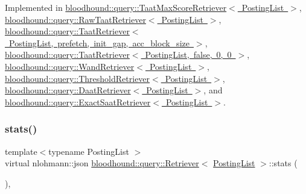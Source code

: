Implemented in \mbox{\hyperlink{classbloodhound_1_1query_1_1TaatMaxScoreRetriever_af4d96478395b58527969526c3068e7b9}{bloodhound\+::query\+::\+Taat\+Max\+Score\+Retriever$<$ Posting\+List $>$}}, \mbox{\hyperlink{classbloodhound_1_1query_1_1RawTaatRetriever_aafaaf842fdaef297a255e28766af2c0d}{bloodhound\+::query\+::\+Raw\+Taat\+Retriever$<$ Posting\+List $>$}}, \mbox{\hyperlink{classbloodhound_1_1query_1_1TaatRetriever_a58284f19458689021a083c07ea627485}{bloodhound\+::query\+::\+Taat\+Retriever$<$ Posting\+List, prefetch, init\+\_\+gap, acc\+\_\+block\+\_\+size $>$}}, \mbox{\hyperlink{classbloodhound_1_1query_1_1TaatRetriever_a58284f19458689021a083c07ea627485}{bloodhound\+::query\+::\+Taat\+Retriever$<$ Posting\+List, false, 0, 0 $>$}}, \mbox{\hyperlink{classbloodhound_1_1query_1_1WandRetriever_a5f3068bc363c16c5b7255a925ea5af8c}{bloodhound\+::query\+::\+Wand\+Retriever$<$ Posting\+List $>$}}, \mbox{\hyperlink{classbloodhound_1_1query_1_1ThresholdRetriever_a06750450e1246e755ebad2d5dac6e8a8}{bloodhound\+::query\+::\+Threshold\+Retriever$<$ Posting\+List $>$}}, \mbox{\hyperlink{classbloodhound_1_1query_1_1DaatRetriever_ab80b4867fc263827dc2fdbe0965a2e8c}{bloodhound\+::query\+::\+Daat\+Retriever$<$ Posting\+List $>$}}, and \mbox{\hyperlink{classbloodhound_1_1query_1_1ExactSaatRetriever_aced2763cc2a4c12838fef4a20759049e}{bloodhound\+::query\+::\+Exact\+Saat\+Retriever$<$ Posting\+List $>$}}.

\mbox{\label{classbloodhound_1_1query_1_1Retriever_a58da32a5139b980ba874f8b5e6bb89ec}} 
\subsubsection{\texorpdfstring{stats()}{stats()}}
{\footnotesize\ttfamily template$<$typename Posting\+List $>$ \\
virtual nlohmann\+::json \mbox{\hyperlink{classbloodhound_1_1query_1_1Retriever}{bloodhound\+::query\+::\+Retriever}}$<$ \mbox{\hyperlink{classbloodhound_1_1PostingList}{Posting\+List}} $>$\+::stats (\begin{DoxyParamCaption}{ }\end{DoxyParamCaption})\hspace{0.3cm}{\ttfamily [inline]}, {\ttfamily [virtual]}}



